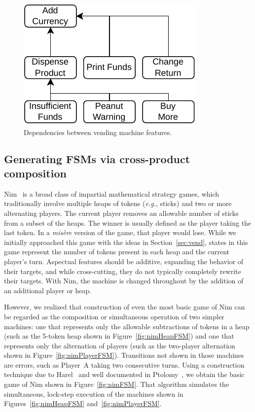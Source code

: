 \documentclass[conference]{IEEEtran}
\begin{document}
\begin{figure}
    \centering
    \includegraphics[width=0.55\linewidth]{figures/VendingMachine.pdf}
    \caption{Dependencies between vending machine features.}
    \label{fig:vmDependencies}
\end{figure}

\subsection{Generating FSMs via cross-product composition}\label{sec:nim}

Nim~\cite{enwiki:1102668015} is a broad class of impartial mathematical strategy games, which traditionally involve multiple heaps of tokens (\emph{e.g.}, sticks) and two or more alternating players. The current player removes an allowable number of sticks from a subset of the heaps. The winner is usually defined as the player taking the last token. In a \emph{mis\`{e}re} version of the game, that player would lose.
While we initially approached this game with the ideas in Section~\ref{sec:vend}, states in this game represent the number of tokens present in each heap and the current player's turn.  Aspectual features should be additive, expanding the behavior of their targets, and while cross-cutting, they do not typically completely rewrite their targets.  With Nim, the machine is changed throughout by the addition of an additional player or heap.   

However, we realized that construction of even the most basic game of Nim can be regarded as the composition or simultaneous operation of two simpler machines:   one that represents only the allowable subtractions of tokens in a heap (such as the 5-token heap shown in Figure~\ref{fig:nimHeapFSM}) and one that represents only the alternation of players (such as the two-player alternation shown in Figure~\ref{fig:nimPlayerFSM}).  Transitions not shown in those machines are errors, such as Player~A taking two consecutive turns.  Using a construction technique due to Harel~\cite{HAREL1987231} and well documented in Ptolomy~\cite{EdwardLee}, we obtain the basic game of Nim shown in Figure~\ref{fig:nimFSM}.  That algorithm simulates the simultaneous, lock-step execution of the machines shown in Figures~\ref{fig:nimHeapFSM} and~\ref{fig:nimPlayerFSM}.
\end{document}

